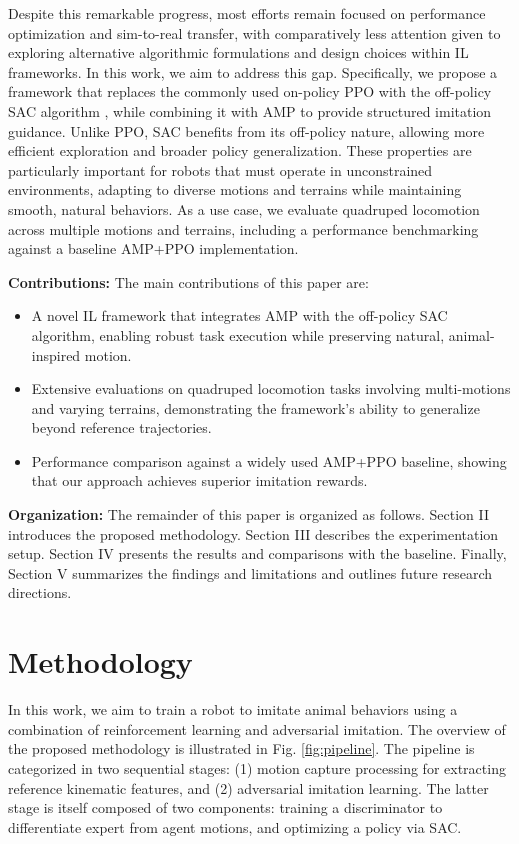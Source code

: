 \documentclass[letterpaper, 10pt, conference]{IEEEtran}
\begin{document}
Despite this remarkable progress, most efforts remain focused on performance optimization and sim-to-real transfer, with comparatively less attention given to exploring alternative algorithmic formulations and design choices within IL frameworks. In this work, we aim to address this gap. Specifically, we propose a framework that replaces the commonly used on-policy PPO with the off-policy SAC algorithm \cite{Haarnoja2018}, while combining it with AMP \cite{Peng2021, Escontrela2022} to provide structured imitation guidance. Unlike PPO, SAC benefits from its off-policy nature, allowing more efficient exploration and broader policy generalization. These properties are particularly important for robots that must operate in unconstrained environments, adapting to diverse motions and terrains while maintaining smooth, natural behaviors. As a use case, we evaluate quadruped locomotion across multiple motions and terrains, including a performance benchmarking against a baseline AMP+PPO implementation.

\textbf{Contributions:} The main contributions of this paper are:
\begin{itemize}
    \item A novel IL framework that integrates AMP with the off-policy SAC algorithm, enabling robust task execution while preserving natural, animal-inspired motion.
    \item Extensive evaluations on quadruped locomotion tasks involving multi-motions and varying terrains, demonstrating the framework's ability to generalize beyond reference trajectories.
    \item Performance comparison against a widely used AMP+PPO baseline, showing that our approach achieves superior imitation rewards.
\end{itemize}

\textbf{Organization:} The remainder of this paper is organized as follows. Section II introduces the proposed methodology. Section III describes the experimentation setup. Section IV presents the results and comparisons with the baseline. Finally, Section V summarizes the findings and limitations and outlines future research directions.

\section{Methodology}

In this work, we aim to train a robot to imitate animal behaviors using a combination of reinforcement learning and adversarial imitation. The overview of the proposed methodology is illustrated in Fig. \ref{fig:pipeline}. The pipeline is categorized in two sequential stages: (1) motion capture processing for extracting reference kinematic features, and (2) adversarial imitation learning. The latter stage is itself composed of two components: training a discriminator to differentiate expert from agent motions, and optimizing a policy via SAC.
\end{document}
